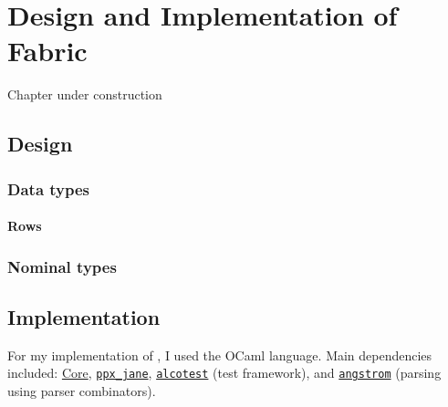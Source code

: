 \chapter{Design and Implementation of Fabric}
\label{fabric}

\begin{center}
    \Large \color{red} Chapter under construction
\end{center}

\todo[color=red]{}

\section{Design}

\cite{mlstruct, forsythe, pizza-java}
\todo[color=red]{}

\subsection{Data types}

\cite{dolan-thesis, mlstruct}
\todo[color=red]{}

\subsubsection{Rows}
\todo[color=red]{}


\subsection{Nominal types} 

\cite{integrating-nominal-and-structural, structural-refinement-types}
\todo[color=red]{}

\section{Implementation}

For my implementation of \compiler{}, I used the OCaml language. Main dependencies included: \href{https://opensource.janestreet.com/core/}{Core}, \href{https://github.com/janestreet/ppx_jane}{\texttt{ppx\_jane}}, \href{https://github.com/mirage/alcotest}{\texttt{alcotest}} (test framework), and \href{https://github.com/inhabitedtype/angstrom}{\texttt{angstrom}} (parsing \fabric{} using parser combinators).

